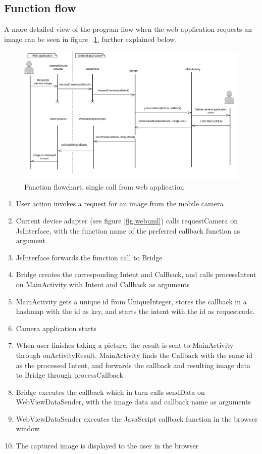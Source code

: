 \subsection{Function flow} \label{subsec:function-flow-native}
A more detailed view of the program flow when the web application requests an image can be seen in figure ~\ref{fig:nativeflow}, further explained below.
\begin{figure}[h!]
	\centering
    \includegraphics[width=120mm,natwidth=800,natheight=600]{./img/androidfunctionflow.png}
    \caption{Function flowchart, single call from web application}
    \label{fig:nativeflow}
\end{figure}
\begin{enumerate}
	\item User action invokes a request for an image from the mobile camera
	\item Current device adapter (see figure \ref{fig:webuml}) calls requestCamera on JsInterface, with the function name of the preferred callback function as argument
	\item JsInterface forwards the function call to Bridge
	\item Bridge creates the corresponding Intent and Callback, and calls processIntent on MainActivity with Intent and Callback as arguments
	\item MainActivity gets a unique id from UniqueInteger, stores the callback in a hashmap with the id as key, and starts the intent with the id as requestcode.
	\item Camera application starts
	\item When user finishes taking a picture, the result is sent to MainActivity through onActivityResult. MainActivity finds the Callback with the same id as the processed Intent, and forwards the callback and resulting image data to Bridge through processCallback
	\item Bridge executes the callback which in turn calls sendData on WebViewDataSender, with the image data and callback name as arguments
	\item WebViewDataSender executes the JavaScript callback function in the browser window
	\item The captured image is displayed to the user in the browser
\end{enumerate}

